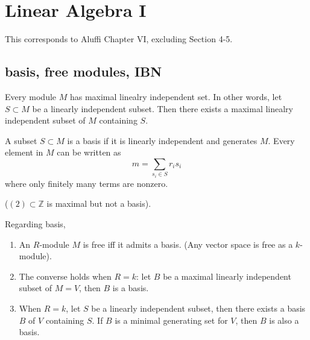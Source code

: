 \documentclass[openany]{book}
\newcommand{\Z}{\mathbb{Z}}
\begin{document}









\chapter{Linear Algebra I}
This corresponds to Aluffi Chapter VI, excluding Section 4-5.

\section{basis, free modules, IBN}

\begin{prop}[Zorn's]
    Every module $M$ has maximal linealry independent set. In other words, let $S\subset M$ be a linearly independent subset. Then there exists a maximal linealry independent subset of $M$ containing $S$.
\end{prop}

\begin{defn}[basis]
    A subset $S\subset M$ is a basis if it is linearly independent and generates $M$. Every element in $M$ can be written as 
    \begin{equation*}
        m=\sum_{s_i\in S}r_is_i
    \end{equation*}
    where only finitely many terms are nonzero.
    
    ($(2)\subset\Z$ is maximal but not a basis).
\end{defn}


\begin{prop}
    Regarding basis, 
    \begin{enumerate}
        \item An $R$-module $M$ is free iff it admits a basis. (Any vector space is free as a $k$-module).
        \item The converse holds when $R=k$: let $B$ be a maximal linearly independent subset of $M=V$, then $B$ is a basis.
        \item When $R=k$, let $S$ be a linearly independent subset, then there exists a basis $B$ of $V$ containing $S$. If $B$ is a minimal generating set for $V$, then $B$ is also a basis.
    \end{enumerate}
\end{prop}
\end{document}

